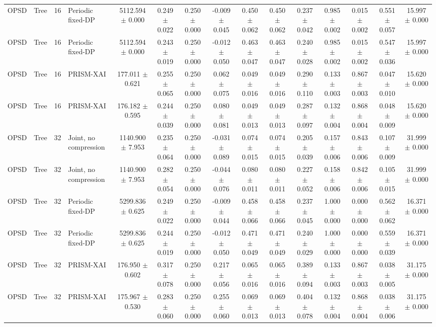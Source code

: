 \begin{tabular}{llllccccccccccc}
OPSD & Tree & 16 & Periodic fixed-DP & 5112.594 $\pm$ 0.000 & 0.249 $\pm$ 0.022 & 0.250 $\pm$ 0.000 & -0.009 $\pm$ 0.045 & 0.450 $\pm$ 0.062 & 0.450 $\pm$ 0.062 & 0.237 $\pm$ 0.042 & 0.985 $\pm$ 0.002 & 0.015 $\pm$ 0.002 & 0.551 $\pm$ 0.057 & 15.997 $\pm$ 0.000 \\
OPSD & Tree & 16 & Periodic fixed-DP & 5112.594 $\pm$ 0.000 & 0.243 $\pm$ 0.019 & 0.250 $\pm$ 0.000 & -0.012 $\pm$ 0.050 & 0.463 $\pm$ 0.047 & 0.463 $\pm$ 0.047 & 0.240 $\pm$ 0.028 & 0.985 $\pm$ 0.002 & 0.015 $\pm$ 0.002 & 0.547 $\pm$ 0.036 & 15.997 $\pm$ 0.000 \\
OPSD & Tree & 16 & PRISM-XAI & 177.011 $\pm$ 0.621 & 0.255 $\pm$ 0.065 & 0.250 $\pm$ 0.000 & 0.062 $\pm$ 0.075 & 0.049 $\pm$ 0.016 & 0.049 $\pm$ 0.016 & 0.290 $\pm$ 0.110 & 0.133 $\pm$ 0.003 & 0.867 $\pm$ 0.003 & 0.047 $\pm$ 0.010 & 15.620 $\pm$ 0.000 \\
OPSD & Tree & 16 & PRISM-XAI & 176.182 $\pm$ 0.595 & 0.244 $\pm$ 0.039 & 0.250 $\pm$ 0.000 & 0.080 $\pm$ 0.081 & 0.049 $\pm$ 0.013 & 0.049 $\pm$ 0.013 & 0.287 $\pm$ 0.097 & 0.132 $\pm$ 0.004 & 0.868 $\pm$ 0.004 & 0.048 $\pm$ 0.009 & 15.620 $\pm$ 0.000 \\
OPSD & Tree & 32 & Joint, no compression & 1140.900 $\pm$ 7.953 & 0.235 $\pm$ 0.064 & 0.250 $\pm$ 0.000 & -0.031 $\pm$ 0.089 & 0.074 $\pm$ 0.015 & 0.074 $\pm$ 0.015 & 0.205 $\pm$ 0.039 & 0.157 $\pm$ 0.006 & 0.843 $\pm$ 0.006 & 0.107 $\pm$ 0.009 & 31.999 $\pm$ 0.000 \\
OPSD & Tree & 32 & Joint, no compression & 1140.900 $\pm$ 7.953 & 0.282 $\pm$ 0.054 & 0.250 $\pm$ 0.000 & -0.044 $\pm$ 0.076 & 0.080 $\pm$ 0.011 & 0.080 $\pm$ 0.011 & 0.227 $\pm$ 0.052 & 0.158 $\pm$ 0.006 & 0.842 $\pm$ 0.006 & 0.105 $\pm$ 0.015 & 31.999 $\pm$ 0.000 \\
OPSD & Tree & 32 & Periodic fixed-DP & 5299.836 $\pm$ 0.625 & 0.249 $\pm$ 0.022 & 0.250 $\pm$ 0.000 & -0.009 $\pm$ 0.044 & 0.458 $\pm$ 0.066 & 0.458 $\pm$ 0.066 & 0.237 $\pm$ 0.045 & 1.000 $\pm$ 0.000 & 0.000 $\pm$ 0.000 & 0.562 $\pm$ 0.062 & 16.371 $\pm$ 0.000 \\
OPSD & Tree & 32 & Periodic fixed-DP & 5299.836 $\pm$ 0.625 & 0.244 $\pm$ 0.019 & 0.250 $\pm$ 0.000 & -0.012 $\pm$ 0.050 & 0.471 $\pm$ 0.049 & 0.471 $\pm$ 0.049 & 0.240 $\pm$ 0.029 & 1.000 $\pm$ 0.000 & 0.000 $\pm$ 0.000 & 0.559 $\pm$ 0.039 & 16.371 $\pm$ 0.000 \\
OPSD & Tree & 32 & PRISM-XAI & 176.950 $\pm$ 0.602 & 0.317 $\pm$ 0.078 & 0.250 $\pm$ 0.000 & 0.217 $\pm$ 0.056 & 0.065 $\pm$ 0.016 & 0.065 $\pm$ 0.016 & 0.389 $\pm$ 0.094 & 0.133 $\pm$ 0.003 & 0.867 $\pm$ 0.003 & 0.038 $\pm$ 0.005 & 31.175 $\pm$ 0.000 \\
OPSD & Tree & 32 & PRISM-XAI & 175.967 $\pm$ 0.530 & 0.283 $\pm$ 0.060 & 0.250 $\pm$ 0.000 & 0.255 $\pm$ 0.060 & 0.069 $\pm$ 0.013 & 0.069 $\pm$ 0.013 & 0.404 $\pm$ 0.078 & 0.132 $\pm$ 0.004 & 0.868 $\pm$ 0.004 & 0.038 $\pm$ 0.006 & 31.175 $\pm$ 0.000 \\
\bottomrule
\end{tabular}

